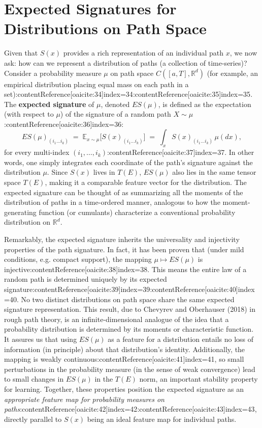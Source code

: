 \documentclass[11pt]{article}
\begin{document}
\section{Expected Signatures for Distributions on Path Space}
Given that $S(x)$ provides a rich representation of an individual path $x$, we now ask: how can we represent a distribution of paths (a collection of time-series)? Consider a probability measure $\mu$ on path space $C([a,T],\mathbb{R}^d)$ (for example, an empirical distribution placing equal mass on each path in a set):contentReference[oaicite:34]{index=34}:contentReference[oaicite:35]{index=35}. The \textbf{expected signature} of $\mu$, denoted $ES(\mu)$, is defined as the expectation (with respect to $\mu$) of the signature of a random path $X \sim \mu$:contentReference[oaicite:36]{index=36}:
\begin{equation}
\label{eq:expected-signature}
ES(\mu)_{(i_1\ldots i_k)} \;=\; \mathbb{E}_{x \sim \mu}\!\Big[S(x)_{(i_1 \ldots i_k)}\Big] \;=\; \int_{x} S(x)_{(i_1\ldots i_k)}\,\mu(dx),
\end{equation}
for every multi-index $(i_1,\dots,i_k)$:contentReference[oaicite:37]{index=37}. In other words, one simply integrates each coordinate of the path’s signature against the distribution $\mu$. Since $S(x)$ lives in $T(E)$, $ES(\mu)$ also lies in the same tensor space $T(E)$, making it a comparable feature vector for the distribution. The expected signature can be thought of as summarizing all the moments of the distribution of paths in a time-ordered manner, analogous to how the moment-generating function (or cumulants) characterize a conventional probability distribution on $\mathbb{R}^d$.

Remarkably, the expected signature inherits the universality and injectivity properties of the path signature. In fact, it has been proven that (under mild conditions, e.g. compact support), the mapping $\mu \mapsto ES(\mu)$ is injective:contentReference[oaicite:38]{index=38}. This means the entire law of a random path is determined uniquely by its expected signature:contentReference[oaicite:39]{index=39}:contentReference[oaicite:40]{index=40}. No two distinct distributions on path space share the same expected signature representation. This result, due to Chevyrev and Oberhauser (2018) in rough path theory, is an infinite-dimensional analogue of the idea that a probability distribution is determined by its moments or characteristic function. It assures us that using $ES(\mu)$ as a feature for a distribution entails no loss of information (in principle) about that distribution's identity. Additionally, the mapping is weakly continuous:contentReference[oaicite:41]{index=41}, so small perturbations in the probability measure (in the sense of weak convergence) lead to small changes in $ES(\mu)$ in the $T(E)$ norm, an important stability property for learning. Together, these properties position the expected signature as an \emph{appropriate feature map for probability measures on paths}:contentReference[oaicite:42]{index=42}:contentReference[oaicite:43]{index=43}, directly parallel to $S(x)$ being an ideal feature map for individual paths.
\end{document}
